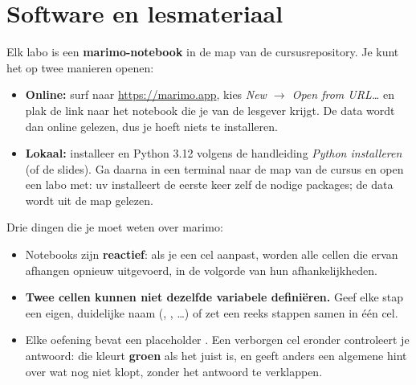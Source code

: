 \section{Software en lesmateriaal}

Elk labo is een \textbf{marimo-notebook} in de map  van de
cursusrepository. Je kunt het op twee manieren openen:

\begin{itemize}
    \item \textbf{Online:} surf naar \url{https://marimo.app}, kies
        \emph{New $\rightarrow$ Open from URL\dots} en plak de link naar
        het notebook die je van de lesgever krijgt. De data wordt dan online
        gelezen, dus je hoeft niets te installeren.
    \item \textbf{Lokaal:} installeer  en Python 3.12 volgens de
        handleiding \emph{Python installeren} (of de slides). Ga daarna in
        een terminal naar de map van de cursus en open een labo met:\newline
        \newline uv
        installeert de eerste keer zelf de nodige packages; de data wordt
        uit de map  gelezen.

\end{itemize}

Drie dingen die je moet weten over marimo:

\begin{itemize}
  \item Notebooks zijn \textbf{reactief}: als je een cel aanpast, worden
        alle cellen die ervan afhangen opnieuw uitgevoerd, in de volgorde
        van hun afhankelijkheden.
  \item \textbf{Twee cellen kunnen niet dezelfde variabele definiëren.}
        Geef elke stap een eigen, duidelijke naam (,
        , \dots) of zet een reeks stappen samen in één
        cel.
  \item Elke oefening bevat een placeholder . Een verborgen cel
        eronder controleert je antwoord: die kleurt \textbf{groen} als het
        juist is, en geeft anders een algemene hint over wat nog niet
        klopt, zonder het antwoord te verklappen.
\end{itemize}
